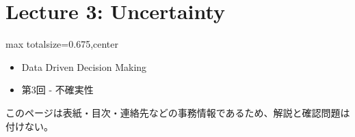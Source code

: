 \section*{Lecture 3: Uncertainty}
\clearpage
{}
\begin{adjustbox}{max totalsize={\textwidth}{0.675\textheight},center}
\begin{minipage}{\textwidth}\scriptsize
\begin{minipage}[t]{0.485\textwidth}
\begin{itemize}
\item Data Driven Decision Making
\item 第3回 - 不確実性
\end{itemize}
\end{minipage}\hfill
\begin{minipage}[t]{0.485\textwidth}
{\small このページは表紙・目次・連絡先などの事務情報であるため、解説と確認問題は付けない。}
\end{minipage}
\end{minipage}
\end{adjustbox}

